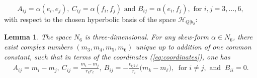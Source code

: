 \documentclass[11pt]{amsart}
\newtheorem{lemma}[theorem]{Lemma}
\theoremstyle{definition}
\def\cH{\mathcal{H}}
\begin{document}
\begin{equation}\label{eq:coordinates}
A_{ij}=\alpha(e_i, e_j), \ C_{ij}=\alpha(f_i,f_j) \mbox{ and } B_{ij}=\alpha(e_i, f_j),  \mbox{ for } i, j=3, \ldots, 6,
\end{equation}
with respect to the chosen hyperbolic basis of the space $\cH_{Q|b_2}$:

\begin{lemma}\label{lemma:N6}
The space $N_6$ is three-dimensional. For any skew-form $\alpha\in N_6$, there exist complex numbers $(m_3, m_4, m_5, m_6)$ unique up to addition of one common constant, such that in terms of the coordinates (\ref{eq:coordinates}), one has
\begin{align}\label{eq:A_ij,B_ij}
A_{ij}=m_i-m_j,     \ C_{ij}=\frac{m_i-m_j}{r_k r_{\ell}}, \ B_{ij}=-\frac{\epsilon_{ijk\ell}}{r_i}\bigl(m_k-m_{\ell}\bigr), \ \mbox{ for } i\neq j, \mbox{ and } \ B_{ii}=0.
\end{align}
\end{lemma}
\end{document}
